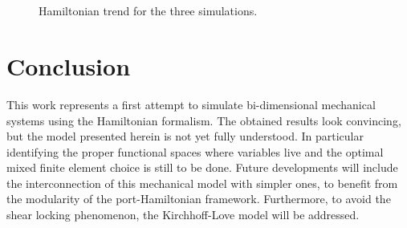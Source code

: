 \documentclass{ifacconf}
\begin{document}
\begin{figure}[h]%
	\centering
	\hspace{8pt}%
	 \\
	 \\
	\caption[Hamiltonian]{Hamiltonian trend for the three simulations.}
	\label{fig:Hamiltonian}
\end{figure}


\section{Conclusion}
This work represents a first attempt to simulate bi-dimensional mechanical systems using the Hamiltonian formalism. The obtained results look convincing, but the model presented herein is not yet fully understood. In particular identifying the proper functional spaces where variables live and the optimal mixed finite element choice is still to be done. Future developments will include the interconnection of this mechanical model with simpler ones, to benefit from the modularity of the port-Hamiltonian framework. Furthermore, to avoid the shear locking phenomenon, the Kirchhoff-Love model will be addressed.
\end{document}
